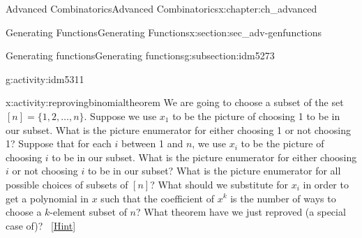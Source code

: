\documentclass[oneside,10pt,]{book}
\numberwithin{equation}{chapter}
\begin{document}
\begin{chapterptx}{Advanced Combinatorics}{}{Advanced Combinatorics}{}{}{x:chapter:ch_advanced}
\begin{sectionptx}{Generating Functions}{}{Generating Functions}{}{}{x:section:sec_adv-genfunctions}
\begin{subsectionptx}{Generating functions}{}{Generating functions}{}{}{g:subsection:idm5273}
\begin{activity}{}{g:activity:idm5311}
\end{activity}
\begin{activity}{}{x:activity:reprovingbinomialtheorem}%
We are going to choose a subset of the set \([n]=\{1,2,\ldots, n\}\). Suppose we use \(x_1\) to be the picture of choosing 1 to be in our subset. What is the picture enumerator for either choosing 1 or not choosing 1? Suppose that for each \(i\) between 1 and \(n\), we use \(x_i\) to be the picture of choosing \(i\) to be in our subset. What is the picture enumerator for either choosing \(i\) or not choosing \(i\) to be in our subset? What is the picture enumerator for all possible choices of subsets of \([n]\)? What should we substitute for \(x_i\) in order to get a polynomial in \(x\) such that the coefficient of \(x^k\) is the number of ways to choose a \(k\)-element subset of \(n\)? What theorem have we just reproved (a special case of)?%
\qquad~\hfill{\tiny\hyperlink{g:hint:idm5345-back}{[Hint]}}\end{activity}

\end{subsectionptx}
\end{sectionptx}
\end{chapterptx}
\end{document}
